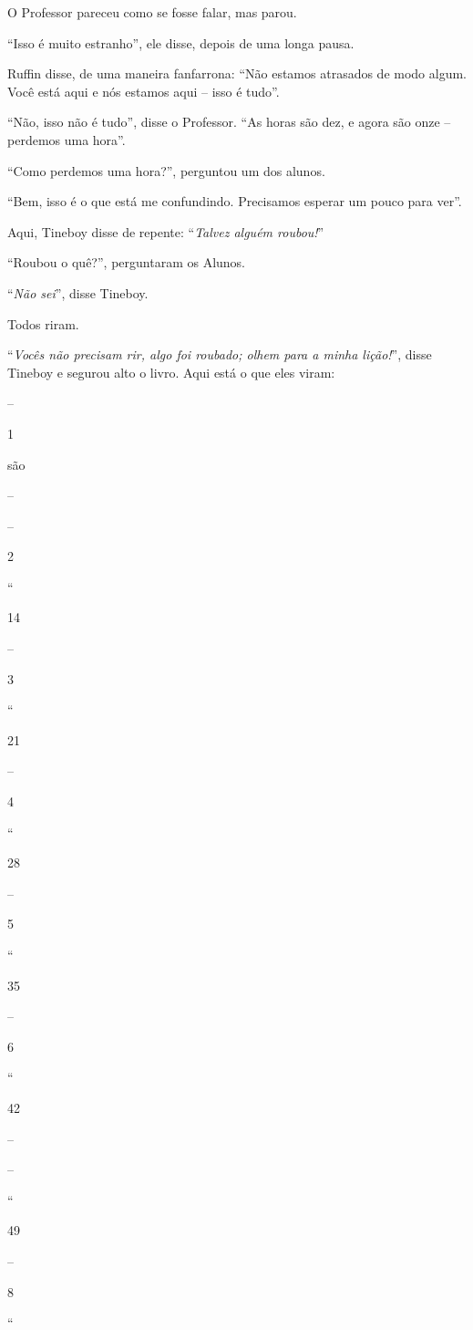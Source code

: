 O Professor pareceu como se fosse falar, mas parou.

``Isso é muito estranho'', ele disse, depois de uma longa pausa.

Ruffin disse, de uma maneira fanfarrona: ``Não estamos atrasados de modo
algum. Você está aqui e nós estamos aqui -- isso é tudo''.

``Não, isso não é tudo'', disse o Professor. ``As horas são dez, e agora
são onze -- perdemos uma hora''.

``Como perdemos uma hora?'', perguntou um dos alunos.

``Bem, isso é o que está me confundindo. Precisamos esperar um pouco
para ver''.

Aqui, Tineboy disse de repente: ``\emph{Talvez alguém roubou!}''

``Roubou o quê?'', perguntaram os Alunos.

``\emph{Não sei}'', disse Tineboy.

Todos riram.

``\emph{Vocês não precisam rir, algo foi roubado; olhem para a minha
lição!}'', disse Tineboy e segurou alto o livro. Aqui está o que eles
viram:

--

1

são

--

--

2

``

14

--

3

``

21

--

4

``

28

--

5

``

35

--

6

``

42

--

--

``

49

--

8

``

